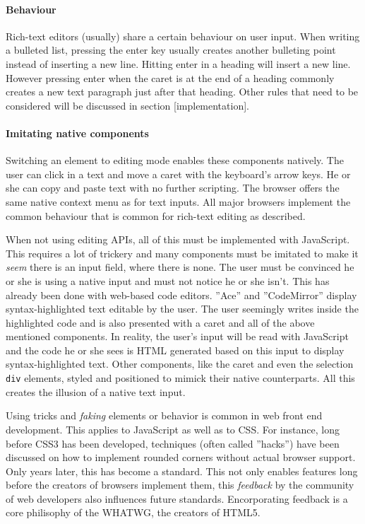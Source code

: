 \paragraph{Behaviour} Rich-text editors (usually) share a certain behaviour on user input. When writing a bulleted list, pressing the enter key usually creates another bulleting point instead of inserting a new line. Hitting enter in  a heading will insert a new line. However pressing enter when the caret is at the end of a heading commonly creates a new text paragraph just after that heading. Other rules that need to be considered will be discussed in section [implementation].

\paragraph{Imitating native components} Switching an element to editing mode enables these components natively. The user can click in a text and move a caret with the keyboard's arrow keys. He or she can copy and paste text with no further scripting. The browser offers the same native context menu as for text inputs. All major browsers implement the common behaviour that is common for rich-text editing as described.

When not using editing APIs, all of this must be implemented with JavaScript. This requires a lot of trickery and many components must be imitated to make it \textit{seem} there is an input field, where there is none. The user must be convinced he or she is using a native input and must not notice he or she isn't. This has already been done with web-based code editors. ''Ace'' and ''CodeMirror'' display syntax-highlighted text editable by the user. The user seemingly writes inside the highlighted code and is also presented with a caret and all of the above mentioned components. In reality, the user's input will be read with JavaScript and the code he or she sees is HTML generated based on this input to display syntax-highlighted text. Other components, like the caret and even the selection \texttt{div} elements, styled and positioned to mimick their native counterparts. All this creates the illusion of a native text input.


Using tricks and \textit{faking} elements or behavior is common in web front end development. This applies to JavaScript as well as to CSS. For instance, long before CSS3 has been developed, techniques (often called ''hacks'') have been discussed on how to implement rounded corners without actual browser support. Only years later, this has become a standard. This not only enables features long before the creators of browsers implement them, this \textit{feedback} by the community of web developers also influences future standards. Encorporating feedback is a core philisophy of the WHATWG, the creators of HTML5.



